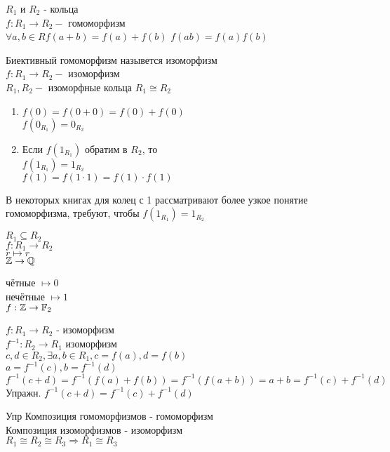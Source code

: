 

\begin{definition}
	$ R_1 $ и $R_2 $ - кольца \\
	$ f : R_1 \rightarrow R_2 - $ гомоморфизм \\
	$  \forall a, b \in R f(a+b) = f(a) + f(b) $
	$ f(ab) = f(a)f(b)$
\end{definition}

\begin{definition}
	Биективный гомоморфизм назывется изоморфизм  \\
	$ f : R_1 \rightarrow R_2 - $ изоморфизм \\
	$ R_1, R_2 - $ изоморфные кольца
	$ R_1 \cong R_2$
\end{definition}
\begin{properties}
	\begin{enumerate}
		\item $ f(0) = f(0+0) = f(0) + f(0) $ \\
		$ f(0_{R_1}) = 0_{R_2} $
		\item Если $f(1_{R_1}) $ обратим в $R_2$, то \\
		$ f(1_{R_1}) = 1_{R_2} $ \\
		$ f(1) = f(1 \cdot 1) = f(1) \cdot f(1) $
		
	\end{enumerate}
\end{properties}
В некоторых книгах для колец с 1 рассматривают более узкое понятие гомоморфизма, требуют, чтобы $ f(1_{R_1}) = 1_{R_2} $\\
\begin{example}
	$ R_1 \subseteq R_2 $ \\
	$ f: R_1 \rightarrow R_2 $ \\
	$ r \mapsto r $ \\
	$ \mathbb{Z} \rightarrow \mathbb{Q} $
\end{example}
\begin{example}
	чётные $ \mapsto 0 $ \\
	нечётные $ \mapsto 1 $ \\
	$ f: \mathbb{Z} \rightarrow \mathbb{F}_2 $
\end{example}
\begin{properties}
	$ f: R_1 \rightarrow R_2 $ - изоморфизм \\
	$ f^{-1} : R_2 \rightarrow R_1 $ изоморфизм \\
	$ c, d \in R_2, \exists a,b \in R_1, c = f(a), d = f(b) $ \\
	$ a = f^{-1}(c), b = f^{-1} (d) $ \\
	$ f^{-1} (c+d) = f^{-1} (f(a) + f(b)) = f^{-1} (f(a+b)) = a+b = f^{-1} (c) + f^{-1} (d) $\\
	Упражн. $ f^{-1} (c+d) = f^{-1}(c) + f^{-1}(d) $ 
\end{properties}
Упр Композиция гомоморфизмов - гомоморфизм\\
Композиция изоморфизмов - изоморфизм\\
$ R_1 \cong R_2 \cong R_3 \Rightarrow R_1 \cong R_3 $

